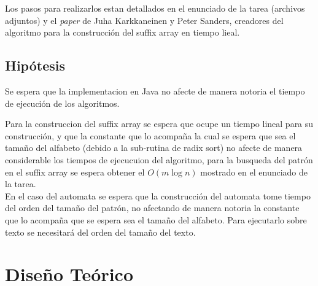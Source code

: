 \documentclass[letterpaper,10pt]{article}
\begin{document}
	Los pasos para realizarlos estan detallados en el enunciado de la tarea (archivos adjuntos) y el \textit{paper} de Juha Karkkaneinen y Peter Sanders, creadores del algoritmo para la construcción del suffix array en tiempo lieal.

	\subsection{Hipótesis}
	
	Se espera que la implementacion en Java no afecte de manera notoria el tiempo de ejecución de los algoritmos.
	
	Para la construccion del suffix array se espera que ocupe un tiempo lineal para su construcción, y que la constante que lo acompaña la cual se espera que sea el tamaño del alfabeto (debido a la sub-rutina de radix sort) no afecte de manera considerable los tiempos de ejecucuion del algoritmo, para la busqueda del patrón en el suffix array se espera obtener el $O(m\log n)$ mostrado en el enunciado de la tarea.\\
	
	En el caso del automata se espera que la construcción del automata tome tiempo del orden del tamaño del patrón, no afectando de manera notoria la constante que lo acompaña que se espera sea el tamaño del alfabeto. Para ejecutarlo sobre texto se necesitará del orden del tamaño del texto.
	
	

	

	\newpage

	\section{Diseño Teórico}
	
\end{document}
